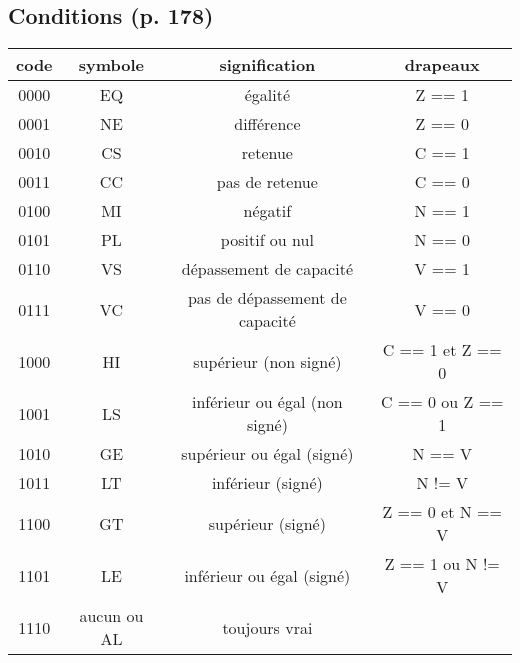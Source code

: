 \documentclass{article}
\begin{document}
    \subsection{Conditions (p. 178)}
    \label{subsec:CondFlags}

    \begin{tabular}{| c | c | c | c |}
        \hline
        \textbf{code} & \textbf{symbole} & \textbf{signification}         & \textbf{drapeaux} \\
        \hline
        0000          & EQ               & égalité                        & Z == 1            \\
        \hline
        0001          & NE               & différence                     & Z == 0            \\
        \hline
        0010          & CS               & retenue                        & C == 1            \\
        \hline
        0011          & CC               & pas de retenue                 & C == 0            \\
        \hline
        0100          & MI               & négatif                        & N == 1            \\
        \hline
        0101          & PL               & positif ou nul                 & N == 0            \\
        \hline
        0110          & VS               & dépassement de capacité        & V == 1            \\
        \hline
        0111          & VC               & pas de dépassement de capacité & V == 0            \\
        \hline
        1000          & HI               & supérieur (non signé)          & C == 1 et Z == 0  \\
        \hline
        1001          & LS               & inférieur ou égal (non signé)  & C == 0 ou Z == 1  \\
        \hline
        1010          & GE               & supérieur ou égal (signé)      & N == V            \\
        \hline
        1011          & LT               & inférieur (signé)              & N != V            \\
        \hline
        1100          & GT               & supérieur (signé)              & Z == 0 et N == V  \\
        \hline
        1101          & LE               & inférieur ou égal (signé)      & Z == 1 ou N != V  \\
        \hline
        1110          & aucun ou AL      & toujours vrai                  &                   \\
        \hline
    \end{tabular}
\end{document}
